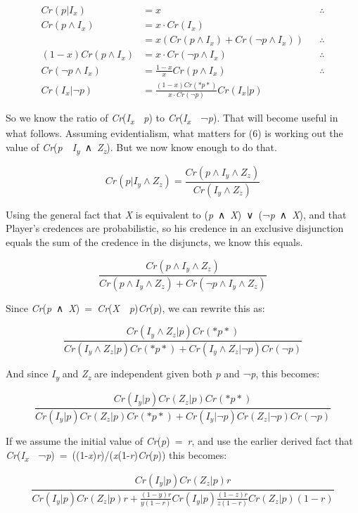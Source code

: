 \documentclass[
  10pt,
  letterpaper,
  DIV=11,
  numbers=noendperiod,
  twoside]{scrartcl}
\begin{document}
\begin{align*}
Cr(p | I_x) &= x &&\therefore \\
Cr(p ∧ I_x) &= x \cdot Cr(I_x) \\
 &= x (Cr(p ∧ I_x) + Cr(\neg p ∧ I_x)) &&\therefore \\
(1-x)Cr(p ∧ I_x) &= x \cdot Cr(\neg p ∧ I_x) &&\therefore \\
Cr(\neg p ∧ I_x) &= \frac{1-x}{x} Cr(p ∧ I_x) &&\therefore \\
Cr(I_x | \neg p) &= \frac{(1-x)Cr(*p*)}{x\cdot Cr(\neg p)}Cr(I_x | p)
\end{align*}

So we know the ratio of
\emph{Cr}(\emph{I\textsubscript{x}}~\textbar~\emph{p}) to
\emph{Cr}(\emph{I\textsubscript{x}}~\textbar~¬\emph{p}). That will
become useful in what follows. Assuming evidentialism, what matters for
(6) is working out the value of
\emph{Cr}(\emph{p}~\textbar~\emph{I\textsubscript{y}}~∧~\emph{Z\textsubscript{z}}).
But we now know enough to do that.

\[
Cr(p | I_y ∧ Z_z) = \frac{Cr(p ∧ I_y ∧ Z_z)}{Cr(I_y ∧ Z_z)}
\]

Using the general fact that \emph{X} is equivalent to
(\emph{p}~∧~\emph{X})~∨~(¬\emph{p}~∧~\emph{X}), and that Player's
credences are probabilistic, so his credence in an exclusive disjunction
equals the sum of the credence in the disjuncts, we know this equals.

\[
\frac{Cr(p ∧ I_y ∧ Z_z)}{Cr(p ∧ I_y ∧ Z_z) + Cr(\neg p ∧ I_y ∧ Z_z)}
\]

Since
\emph{Cr}(\emph{p}~∧~\emph{X})~=~\emph{Cr}(\emph{X}~\textbar~\emph{p})\emph{Cr}(\emph{p}),
we can rewrite this as:

\[
\frac{Cr(I_y ∧ Z_z | p) Cr(*p*)}{Cr(I_y ∧ Z_z | p)Cr(*p*) + Cr(I_y ∧ Z_z | \neg p)Cr(\neg p)}
\]

And since \emph{I\textsubscript{y}} and \emph{Z\textsubscript{z}} are
independent given both \emph{p} and ¬\emph{p}, this becomes:

\[
\frac{Cr(I_y| p) Cr(Z_z | p) Cr(*p*)}{Cr(I_y| p) Cr(Z_z | p) Cr(*p*) + Cr(I_y| \neg p) Cr(Z_z | \neg p) Cr(\neg p)}
\]

If we assume the initial value of \emph{Cr}(\emph{p})~=~\emph{r}, and
use the earlier derived fact that
\emph{Cr}(\emph{I\textsubscript{x}}~\textbar~¬\emph{p})~=~((1-\emph{x})\emph{r})/(\emph{x}(1-\emph{r})\emph{Cr}(\emph{p}))
this becomes:

\[
\frac{Cr(I_y| p) Cr(Z_z | p)r}{Cr(I_y| p) Cr(Z_z | p)r + \frac{(1-y)r}{y(1-r)} Cr(I_y| p) \frac{(1-z)r}{z(1-r)} Cr(Z_z | p) (1-r)}
\]
\end{document}
